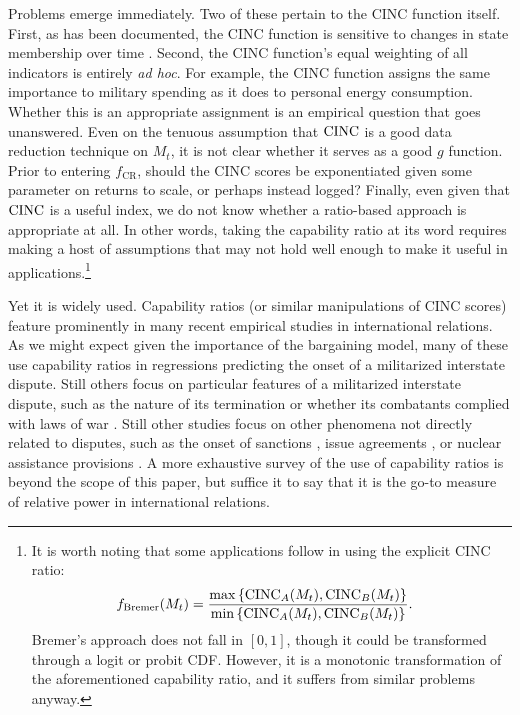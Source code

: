 Problems emerge immediately.
Two of these pertain to the CINC function itself.
First, as has been documented, the CINC function is sensitive to changes in state membership over time \citep{organski1980,gleditsch1999,kadera2004}.
Second, the CINC function's equal weighting of all indicators is entirely \emph{ad hoc}.
For example, the CINC function assigns the same importance to military spending as it does to personal energy consumption.
Whether this is an appropriate assignment is an empirical question that goes unanswered.
Even on the tenuous assumption that $\operatorname{CINC}$ is a good data reduction technique on $M_t$, it is not clear whether it serves as a good $g$ function.
Prior to entering $f_{\text{CR}}$, should the CINC scores be exponentiated given some parameter on returns to scale, or perhaps instead logged?
Finally, even given that $\operatorname{CINC}$ is a useful index, we do not know whether a ratio-based approach is appropriate at all.
In other words, taking the capability ratio at its word requires making a host of assumptions that may not hold well enough to make it useful in applications.\footnote{
  It is worth noting that some applications follow \citet{bremer1992} in using the explicit CINC ratio:
  \begin{align*}
    f_{\text{Bremer}}(M_t) &= \frac{\max\left\{\operatorname{CINC}_A(M_t),\operatorname{CINC}_B(M_t)\right\}}{\min\left\{\operatorname{CINC}_A(M_t),\operatorname{CINC}_B(M_t)\right\}}.
  \end{align*}
  Bremer's approach does not fall in $[0,1]$, though it could be transformed through a logit or probit CDF.
  However, it is a monotonic transformation of the aforementioned capability ratio, and it suffers from similar problems anyway.
}

Yet it is widely used. Capability ratios (or similar manipulations of CINC scores) feature prominently in many recent empirical studies in international relations.
As we might expect given the importance of the bargaining model, many of these \citep[e.g.][]{gartzke2007,salehyan2008} use capability ratios in regressions predicting the onset of a militarized interstate dispute.
Still others focus on particular features of a militarized interstate dispute, such as the nature of its termination \citep{beardsley2008} or whether its combatants complied with laws of war \citep{morrow2007}.
Still other studies focus on other phenomena not directly related to disputes, such as the onset of sanctions \citep{whang2013}, issue agreements \citep{mitchell2007}, or nuclear assistance provisions \citep{kroenig2009}.
A more exhaustive survey of the use of capability ratios is beyond the scope of this paper, but suffice it to say that it is the go-to measure of relative power in international relations.


